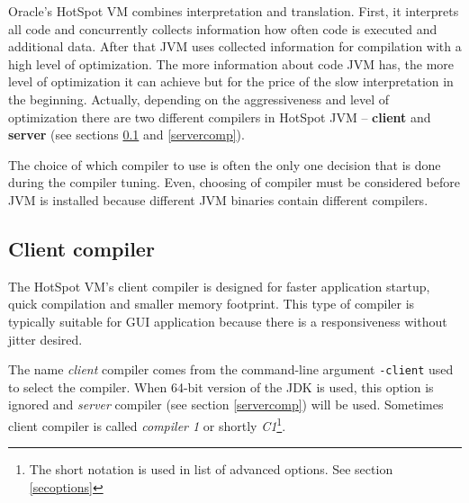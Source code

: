 \documentclass[
  digital, %
  oneside,
  notable, %
  nolof,     %
  nolot     %
]{fithesis3}
\begin{document}
Oracle's HotSpot VM combines interpretation and translation. First, it interprets all code and concurrently collects information how often code is executed and additional data. After that JVM uses collected information for compilation with a high level of optimization. The more information about code JVM has, the more level of optimization it can achieve but for the price of the slow interpretation in the beginning. Actually, depending on the aggressiveness and level of optimization there are two different compilers in HotSpot JVM -- \textbf{client} and \textbf{server} (see sections \ref{clientcomp} and \ref{servercomp}).

The choice of which compiler to use is often the only one decision that is done during the compiler tuning. Even, choosing of compiler must be considered before JVM is installed because different JVM binaries contain different compilers. \cite{scott}


\subsection{Client compiler}\label{clientcomp}
The HotSpot VM's client compiler is designed for faster application startup, quick compilation and smaller memory footprint. This type of compiler is typically suitable for GUI application because there is a responsiveness without jitter desired. \cite{hunt}

The name \textit{client} compiler comes from the command-line argument \texttt{-client} used to select the compiler. When 64-bit version of the JDK is used, this option is ignored and \textit{server} compiler (see section \ref{servercomp}) will be used. Sometimes client compiler is called \textit{compiler 1} or shortly \textit{C1}\footnote{The short notation is used in list of advanced options. See section \ref{secoptions}}. \cite{scott} \cite{java}
\end{document}
